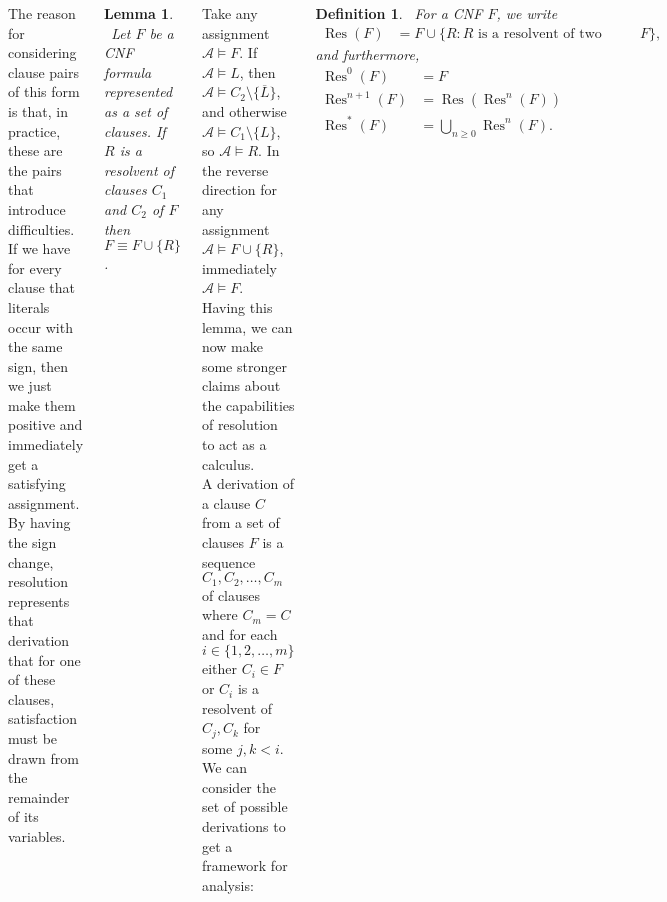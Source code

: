 \documentclass{tikzposter} %
\DeclareMathOperator{\Res}{Res}
\newtheorem{lemma}[theorem]{Lemma}
\newtheorem{definition}{Definition}
\begin{document}
\begin{columns}
{    The reason for considering clause pairs of this form is that, in practice, these are the pairs that introduce difficulties. If we have for every clause that literals occur with the same sign, then we just make them positive and immediately get a satisfying assignment. \\

    By having the sign change, resolution represents that derivation that for one of these clauses, satisfaction must be drawn from the remainder of its variables. \\

    \begin{lemma}
    \ Let $F$ be a CNF formula represented as a set of clauses. If $R$ is a resolvent of clauses $C_{1}$ and $C_{2}$ of $F$ then $F \equiv F \cup \{R\}$.
    \end{lemma}
    \hphantom{}

    Take any assignment $\mathcal{A} \vDash F$. If $\mathcal{A} \vDash L$, then $\mathcal{A} \vDash C_{2} \setminus \{\overline{L}\}$, and otherwise $\mathcal{A} \vDash C_{1} \setminus \{L\}$, so $\mathcal{A} \vDash R$. In the reverse direction for any assignment $\mathcal{A} \vDash F \cup \{R\}$, immediately $\mathcal{A} \vDash F$. \\

    Having this lemma, we can now make some stronger claims about the capabilities of resolution to act as a calculus. \\

    A derivation of a clause $C$ from a set of clauses $F$ is a sequence $C_{1},C_{2}, \dots, C_{m}$ of clauses where $C_{m} = C$ and for each $i \in \{1, 2, \dots, m\}$ either $C_{i} \in F$ or $C_{i}$ is a resolvent of $C_{j}, C_{k}$ for some $j, k < i$. We can consider the set of possible derivations to get a framework for analysis:\\

    \begin{definition}
      \ For a CNF $F$, we write
      \begin{align*}
        \Res(F) &= F \cup \{ R : R \text{ is a resolvent of two clauses in } F\},
      \end{align*}
      and furthermore,
      \begin{align*}
        \Res^{0}(F) &= F \\
        \Res^{n+1}(F) &= \Res(\Res^{n}(F)) \\
        \Res^{*}(F) &= \bigcup_{n \ge 0} \Res^{n}(F).
      \end{align*}
    \end{definition}
    \hphantom{}

}
\end{columns}
\end{document}
